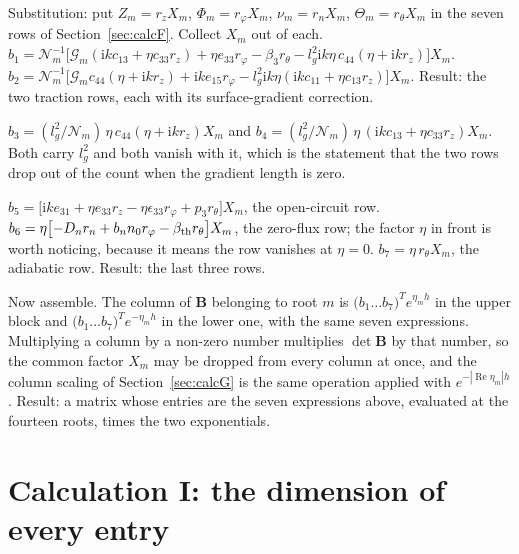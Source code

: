 \documentclass[11pt]{article}
\makeatletter
\newif\ifshowworked
\newenvironment{worked}{%
  \ifshowworked\par\smallskip\noindent\textit{Working.}\par\smallskip\else
  \setbox\z@\vbox\bgroup\fi}{\ifshowworked\par\smallskip\else\egroup\fi}
\newcommand{\ii}{\mathrm{i}}
\newcommand{\Ncal}{\mathcal{N}}
\newcommand{\Gcal}{\mathcal{G}}
\makeatother
\begin{document}
\begin{worked}
Substitution: put $Z_m=r_zX_m$, $\Phi_m=r_\varphi X_m$, $\nu_m=r_nX_m$, $\Theta_m=r_\theta X_m$ in the
seven rows of Section~\ref{sec:calcF}. Collect $X_m$ out of each.
$b_1=\Ncal_m^{-1}\bigl[\Gcal_m(\ii kc_{13}+\eta c_{33}r_z)+\eta e_{33}r_\varphi-\beta_3r_\theta
-l_g^2\ii k\eta\,c_{44}(\eta+\ii kr_z)\bigr]X_m$.
$b_2=\Ncal_m^{-1}\bigl[\Gcal_mc_{44}(\eta+\ii kr_z)+\ii ke_{15}r_\varphi
-l_g^2\ii k\eta(\ii kc_{11}+\eta c_{13}r_z)\bigr]X_m$.
Result: the two traction rows, each with its surface-gradient correction.
\end{worked}

\begin{worked}
$b_3=(l_g^2/\Ncal_m)\,\eta\,c_{44}(\eta+\ii kr_z)X_m$ and
$b_4=(l_g^2/\Ncal_m)\,\eta\,(\ii kc_{13}+\eta c_{33}r_z)X_m$. Both carry $l_g^2$ and both vanish with it,
which is the statement that the two rows drop out of the count when the gradient length is zero.
\end{worked}

\begin{worked}
$b_5=\bigl[\ii ke_{31}+\eta e_{33}r_z-\eta\epsilon_{33}r_\varphi+p_3r_\theta\bigr]X_m$, the open-circuit
row. $b_6=\eta\bigl[-D_nr_n+b_nn_0r_\varphi-\beta_{\rm th}r_\theta\bigr]X_m$, the zero-flux row; the factor
$\eta$ in front is worth noticing, because it means the row vanishes at $\eta=0$.
$b_7=\eta\,r_\theta X_m$, the adiabatic row. Result: the last three rows.
\end{worked}

\begin{worked}
Now assemble. The column of $\mathbf B$ belonging to root $m$ is
$\bigl(b_1\ldots b_7\bigr)^{T}e^{\eta_mh}$ in the upper block and
$\bigl(b_1\ldots b_7\bigr)^{T}e^{-\eta_mh}$ in the lower one, with the same seven expressions. Multiplying
a column by a non-zero number multiplies $\det\mathbf B$ by that number, so the common factor $X_m$ may be
dropped from every column at once, and the column scaling of Section~\ref{sec:calcG} is the same operation
applied with $e^{-|\operatorname{Re}\eta_m|h}$. Result: a matrix whose entries are the seven expressions
above, evaluated at the fourteen roots, times the two exponentials.
\end{worked}

\section{Calculation I: the dimension of every entry}
\end{document}
